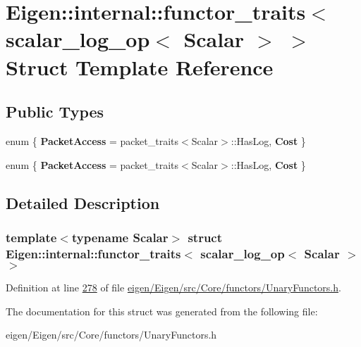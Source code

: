 \hypertarget{struct_eigen_1_1internal_1_1functor__traits_3_01scalar__log__op_3_01_scalar_01_4_01_4}{}\section{Eigen\+:\+:internal\+:\+:functor\+\_\+traits$<$ scalar\+\_\+log\+\_\+op$<$ Scalar $>$ $>$ Struct Template Reference}
\label{struct_eigen_1_1internal_1_1functor__traits_3_01scalar__log__op_3_01_scalar_01_4_01_4}
\subsection*{Public Types}
\begin{DoxyCompactItemize}
\item 
\mbox{\label{struct_eigen_1_1internal_1_1functor__traits_3_01scalar__log__op_3_01_scalar_01_4_01_4_abfba02b4ef61d312fc2f17f4e4e3c1e1}} 
enum \{ {\bfseries Packet\+Access} = packet\+\_\+traits$<$Scalar$>$\+:\+:Has\+Log, 
{\bfseries Cost}
 \}
\item 
\mbox{\label{struct_eigen_1_1internal_1_1functor__traits_3_01scalar__log__op_3_01_scalar_01_4_01_4_a36b5853aa792bbd543f06333f79f87a5}} 
enum \{ {\bfseries Packet\+Access} = packet\+\_\+traits$<$Scalar$>$\+:\+:Has\+Log, 
{\bfseries Cost}
 \}
\end{DoxyCompactItemize}


\subsection{Detailed Description}
\subsubsection*{template$<$typename Scalar$>$\newline
struct Eigen\+::internal\+::functor\+\_\+traits$<$ scalar\+\_\+log\+\_\+op$<$ Scalar $>$ $>$}



Definition at line \hyperlink{eigen_2_eigen_2src_2_core_2functors_2_unary_functors_8h_source_l00278}{278} of file \hyperlink{eigen_2_eigen_2src_2_core_2functors_2_unary_functors_8h_source}{eigen/\+Eigen/src/\+Core/functors/\+Unary\+Functors.\+h}.



The documentation for this struct was generated from the following file\+:\begin{DoxyCompactItemize}
\item 
eigen/\+Eigen/src/\+Core/functors/\+Unary\+Functors.\+h\end{DoxyCompactItemize}
